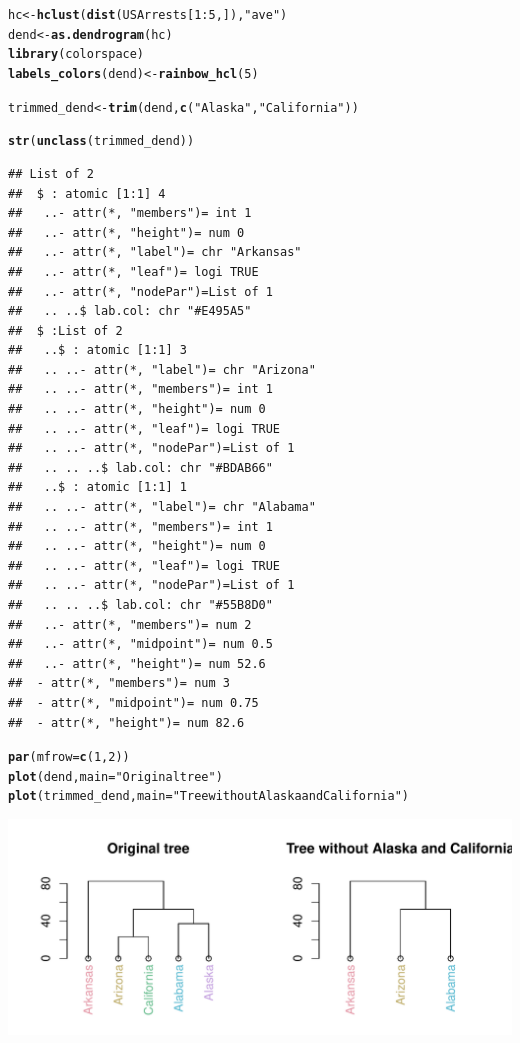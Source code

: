\documentclass[shortnames,nojss,article]{jss}\usepackage{graphicx, color}
\makeatletter
\def\maxwidth{ %
  \ifdim\Gin@nat@width>\linewidth
    \linewidth
  \else
    \Gin@nat@width
  \fi
}
\newcommand{\hlfunctioncall}[1]{\textcolor[rgb]{0.501960784313725,0,0.329411764705882}{\textbf{#1}}}%
\newcommand{\hlstring}[1]{\textcolor[rgb]{0.6,0.6,1}{#1}}%
\newenvironment{kframe}{%
 \def\at@end@of@kframe{}%
 \ifinner\ifhmode%
  \def\at@end@of@kframe{\end{minipage}}%
  \begin{minipage}{\columnwidth}%
 \fi\fi%
 \def\FrameCommand##1{\hskip\@totalleftmargin \hskip-\fboxsep
 \colorbox{shadecolor}{##1}\hskip-\fboxsep
     \hskip-\linewidth \hskip-\@totalleftmargin \hskip\columnwidth}%
 \MakeFramed {\advance\hsize-\width
   \@totalleftmargin\z@ \linewidth\hsize
   \@setminipage}}%
 {\par\unskip\endMakeFramed%
 \at@end@of@kframe}
\newenvironment{knitrout}{}{} %
\makeatother
\begin{document}
\begin{knitrout}
\color{fgcolor}\begin{kframe}
\begin{alltt}

hc <- \hlfunctioncall{hclust}(\hlfunctioncall{dist}(USArrests[1:5, ]), \hlstring{"ave"})
dend <- \hlfunctioncall{as.dendrogram}(hc)
\hlfunctioncall{library}(colorspace)
\hlfunctioncall{labels_colors}(dend) <- \hlfunctioncall{rainbow_hcl}(5)

trimmed_dend <- \hlfunctioncall{trim}(dend, \hlfunctioncall{c}(\hlstring{"Alaska"}, \hlstring{"California"}))

\hlfunctioncall{str}(\hlfunctioncall{unclass}(trimmed_dend))
\end{alltt}
\begin{verbatim}
## List of 2
##  $ : atomic [1:1] 4
##   ..- attr(*, "members")= int 1
##   ..- attr(*, "height")= num 0
##   ..- attr(*, "label")= chr "Arkansas"
##   ..- attr(*, "leaf")= logi TRUE
##   ..- attr(*, "nodePar")=List of 1
##   .. ..$ lab.col: chr "#E495A5"
##  $ :List of 2
##   ..$ : atomic [1:1] 3
##   .. ..- attr(*, "label")= chr "Arizona"
##   .. ..- attr(*, "members")= int 1
##   .. ..- attr(*, "height")= num 0
##   .. ..- attr(*, "leaf")= logi TRUE
##   .. ..- attr(*, "nodePar")=List of 1
##   .. .. ..$ lab.col: chr "#BDAB66"
##   ..$ : atomic [1:1] 1
##   .. ..- attr(*, "label")= chr "Alabama"
##   .. ..- attr(*, "members")= int 1
##   .. ..- attr(*, "height")= num 0
##   .. ..- attr(*, "leaf")= logi TRUE
##   .. ..- attr(*, "nodePar")=List of 1
##   .. .. ..$ lab.col: chr "#55B8D0"
##   ..- attr(*, "members")= num 2
##   ..- attr(*, "midpoint")= num 0.5
##   ..- attr(*, "height")= num 52.6
##  - attr(*, "members")= num 3
##  - attr(*, "midpoint")= num 0.75
##  - attr(*, "height")= num 82.6
\end{verbatim}
\begin{alltt}

\hlfunctioncall{par}(mfrow = \hlfunctioncall{c}(1, 2))
\hlfunctioncall{plot}(dend, main = \hlstring{"Original tree"})
\hlfunctioncall{plot}(trimmed_dend, main = \hlstring{"Tree without Alaska and California"})
\end{alltt}
\end{kframe}

{\centering \includegraphics[width=\maxwidth]{figure/unnamed-chunk-27} 

}



\end{knitrout}
\end{document}
